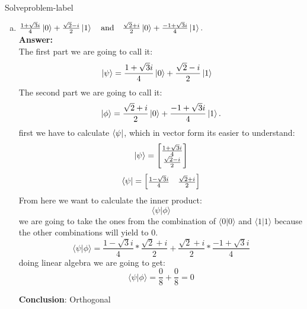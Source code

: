 \begin{problem}{Solve}{problem-label}
\begin{enumerate}[(a)]
	\item $
	\frac{1+\sqrt{3}i}{4} \ket{0} + \frac{\sqrt{2}-i}{2} \ket{1} \quad \text{and} \quad \frac{\sqrt{2}+i}{2} \ket{0} + \frac{-1+\sqrt{3}i}{4} \ket{1}.
	$\\
    \textbf{Answer:}\\
    The first part we are going to call it:
    \[
    \ket{\psi} = \frac{1+\sqrt{3}i}{4} \ket{0} + \frac{\sqrt{2}-i}{2} \ket{1} \quad
    \]
    The second part we are going to call it:
    \[
    \ket{\phi} = \frac{\sqrt{2}+i}{2} \ket{0} + \frac{-1+\sqrt{3}i}{4} \ket{1}.
    \]
   first we have to calculate $ \bra{\psi}$, which in vector form its easier to understand:
    \[
    \ket{\psi} = \begin{bmatrix*}
    	\frac{1+\sqrt{3}i}{4}\\
    	\frac{\sqrt{2}-i}{2} 
    \end{bmatrix*}
    \]
    \[
    \bra{\psi} = 
    \begin{bmatrix}
    	\frac{1-\sqrt{3}i}{4} & \frac{\sqrt{2}+i}{2} 
    \end{bmatrix}
    \]
     From here we want to calculate the inner product:
    \[
    \langle \psi | \phi \rangle
    \]
    we are going to take the ones from the combination of $\langle 0 | 0 \rangle$ and $\langle 1 | 1 \rangle$ because the other combinations will yield to 0.
    \[
    \langle \psi | \phi \rangle = \frac{1-\sqrt{3}i}{4} *  \frac{\sqrt{2}+i}{2}  +  \frac{\sqrt{2}+i}{2} * \frac{-1+\sqrt{3}i}{4}
    \]
    doing linear algebra we are going to get:
    \[
      \langle \psi | \phi \rangle = \frac{0}{8} + \frac{0}{8} = 0
    \]
    
    
    \textbf{Conclusion}: Orthogonal
\end{enumerate}
\end{problem}



